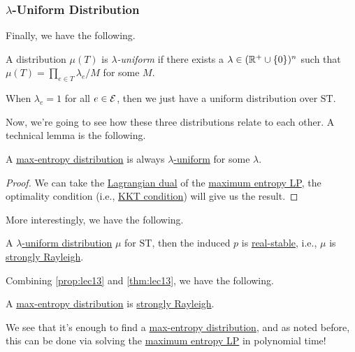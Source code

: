 \subsubsection{\(\lambda \)-Uniform Distribution}
Finally, we have the following.
\begin{definition}\label{def:lambda-uniform}
	A distribution \(\mu (T)\) is \emph{\(\lambda \)-uniform} if there exists a \(\lambda \in (\mathbb{\MakeUppercase{r}} ^+ \cup \left\{ 0 \right\} )^{n}\) such that \(\mu (T) = \prod_{e\in T} \lambda _e / M\) for some \(M\).
\end{definition}

\begin{note}
	When \(\lambda _e = 1\) for all \(e\in \mathcal{\MakeUppercase{e}} \), then we just have a uniform distribution over \(\mathrm{ST}\).
\end{note}

Now, we're going to see how these three distributions relate to each other. A technical lemma is the following.

\begin{proposition}\label{prop:lec13}
	A \hyperref[def:max-entropy-distribution]{max-entropy distribution} is always \hyperref[def:lambda-uniform]{\(\lambda \)-uniform} for some \(\lambda \).
\end{proposition}
\begin{proof}
	We can take the \href{https://en.wikipedia.org/wiki/Duality_(optimization)}{Lagrangian dual} of the \hyperref[eq:max-entropy]{maximum entropy LP}, the optimality condition (i.e., \href{https://en.wikipedia.org/wiki/Karush%E2%80%93Kuhn%E2%80%93Tucker_conditions}{KKT condition}) will give us the result.
\end{proof}

More interestingly, we have the following.

\begin{theorem}\label{thm:lec13}
	A \hyperref[def:lambda-uniform]{\(\lambda \)-uniform distribution} \(\mu \) for \(\mathrm{ST} \), then the induced \(p\) is \hyperref[def:real-stable]{real-stable}, i.e., \(\mu \) is \hyperref[def:strongly-Rayleigh-distribution]{strongly Rayleigh}.
\end{theorem}

Combining \autoref{prop:lec13} and \autoref{thm:lec13}, we have the following.

\begin{corollary}
	A \hyperref[def:max-entropy-distribution]{max-entropy distribution} is \hyperref[def:strongly-Rayleigh-distribution]{strongly Rayleigh}.
\end{corollary}

We see that it's enough to find a \hyperref[def:max-entropy-distribution]{max-entropy distribution}, and as noted before, this can be done via solving the \hyperref[eq:max-entropy]{maximum entropy LP} in polynomial time!